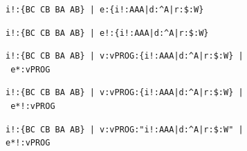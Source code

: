 \documentclass[a4paper, 18pt]{book} %
\begin{document}
\begin{figure}[H]
 \Large
  \centering
  \begin{tcolorbox}[teaterminalstyle, title=Explicit Context Unaware Evaluation]
  \begin{lstlisting}[language=TEA]
i!:{BC CB BA AB} | e:{i!:AAA|d:^A|r:$:W} 
   \end{lstlisting}
  \end{tcolorbox}
\end{figure}


\begin{figure}[H]
 \Large
  \centering
  \begin{tcolorbox}[teaterminalstyle, title=Explicit Extended Context Aware Evaluation]
  \begin{lstlisting}[language=TEA]
i!:{BC CB BA AB} | e!:{i!:AAA|d:^A|r:$:W} 
   \end{lstlisting}
  \end{tcolorbox}
\end{figure}


\begin{figure}[H]
 \Large
  \centering
  \begin{tcolorbox}[teaterminalstyle, title=Context-Unaware Vault Program Evaluation]
  \begin{lstlisting}[language=TEA]
i!:{BC CB BA AB} | v:vPROG:{i!:AAA|d:^A|r:$:W} |
 e*:vPROG  
   \end{lstlisting}
  \end{tcolorbox}
\end{figure}


\begin{figure}[H]
 \Large
  \centering
  \begin{tcolorbox}[teaterminalstyle, title=Injection-Evaluation with In-Vault Program]
  \begin{lstlisting}[language=TEA]
i!:{BC CB BA AB} | v:vPROG:{i!:AAA|d:^A|r:$:W} |
 e*!:vPROG  
   \end{lstlisting}
  \end{tcolorbox}
\end{figure}


\begin{figure}[H]
 \Large
  \centering
  \begin{tcolorbox}[teaterminalstyle, title=Injection-Evaluation with In-Vault Program v2]
  \begin{lstlisting}[language=TEA]
i!:{BC CB BA AB} | v:vPROG:"i!:AAA|d:^A|r:$:W" | 
e*!:vPROG   
   \end{lstlisting}
  \end{tcolorbox}
\end{figure}
\end{document}

